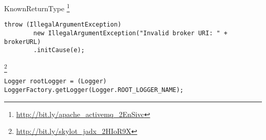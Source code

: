 \begin{pattern}{KnownReturnType}
\footnote{\url{http://bit.ly/apache_activemq_2EnSivc}}

\begin{verbatim}
throw (IllegalArgumentException)
        new IllegalArgumentException("Invalid broker URI: " + brokerURL)
        .initCause(e);
\end{verbatim}




\footnote{\url{http://bit.ly/skylot_jadx_2HIoR9X}}

\begin{verbatim}
Logger rootLogger = (Logger) LoggerFactory.getLogger(Logger.ROOT_LOGGER_NAME);
\end{verbatim}



\detection{}

\discussion{}

\related{}

\end{pattern}